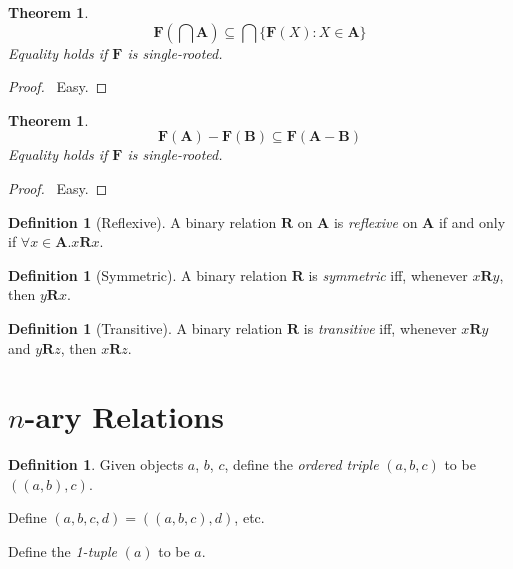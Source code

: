 \documentclass{article}
\let\qed\relax
\newtheorem{theorem}[axiom]{Theorem}
\theoremstyle{definition}
\newtheorem{definition}[axiom]{Definition}
\begin{document}
    \begin{theorem}
        \[ \mathbf{F}(\bigcap \mathbf{A}) \subseteq \bigcap \{ \mathbf{F}(X) : X \in \mathbf{A} \} \]
        Equality holds if $\mathbf{F}$ is single-rooted.
    \end{theorem}

    \begin{proof}
        \pf\ Easy. \qed
    \end{proof}

    \begin{theorem}
        \[ \mathbf{F}(\mathbf{A}) - \mathbf{F}(\mathbf{B}) \subseteq \mathbf{F}(\mathbf{A} - \mathbf{B}) \]
        Equality holds if $\mathbf{F}$ is single-rooted.
    \end{theorem}

    \begin{proof}
        \pf\ Easy. \qed
    \end{proof}

    \begin{definition}[Reflexive]
        A binary relation $\mathbf{R}$ on $\mathbf{A}$ is \emph{reflexive} on $\mathbf{A}$ if and only if
        $\forall x \in \mathbf{A}. x\mathbf{R}x$.
    \end{definition}

    \begin{definition}[Symmetric]
        A binary relation $\mathbf{R}$ is \emph{symmetric} iff, whenever $x\mathbf{R}y$, then $y\mathbf{R}x$.
    \end{definition}

    \begin{definition}[Transitive]
        A binary relation $\mathbf{R}$ is \emph{transitive} iff, whenever $x\mathbf{R}y$ and $y\mathbf{R}z$,
        then $x\mathbf{R}z$.
    \end{definition}

    \section{$n$-ary Relations}

    \begin{definition}
        Given objects $a$, $b$, $c$, define the \emph{ordered triple}
        $(a,b,c)$ to be $((a,b),c)$.

        Define $(a,b,c,d) = ((a,b,c),d)$, etc.

        Define the \emph{1-tuple} $(a)$ to be $a$.
    \end{definition}
\end{document}
